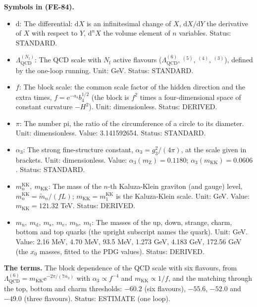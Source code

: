 \documentclass[
  10pt,
]{article}
\providecommand{\tightlist}{%
  \setlength{\itemsep}{0pt}\setlength{\parskip}{0pt}}
\begin{document}
\textbf{Symbols in (FE-84).}

\begin{itemize}
\tightlist
\item
  \(\mathrm{d}\): The differential: \(\mathrm{d}X\) is an infinitesimal
  change of \(X\), \(\mathrm{d}X/\mathrm{d}Y\) the derivative of \(X\)
  with respect to \(Y\), \(\mathrm{d}^nX\) the volume element of \(n\)
  variables. Status: STANDARD.
\item
  \(\Lambda_{\mathrm{QCD}}^{(N_{\mathrm{f}})}\): The QCD scale with
  \(N_{\mathrm{f}}\) active flavours (\(\Lambda_{\mathrm{QCD}}^{(6)}\),
  \(^{(5)}\), \(^{(4)}\), \(^{(3)}\)), defined by the one-loop running.
  Unit: GeV. Status: STANDARD.
\item
  \(f\): The block scale: the common scale factor of the hidden
  direction and the extra times, \(f = \mathrm{e}^{-a_4}b_4^{1/2}\) (the
  block is \(f^2\) times a four-dimensional space of constant curvature
  \(-H^2\)). Unit: dimensionless. Status: DERIVED.
\item
  \(\pi\): The number pi, the ratio of the circumference of a circle to
  its diameter. Unit: dimensionless. Value: 3.141592654. Status:
  STANDARD.
\item
  \(\alpha_3\): The strong fine-structure constant,
  \(\alpha_3 = g_3^2/(4\pi)\), at the scale given in brackets. Unit:
  dimensionless. Value: \(\alpha_3(m_{\mathrm{Z}}) = 0.1180\);
  \(\alpha_3(m_{\mathrm{KK}}) = 0.0606\). Status: STANDARD.
\item
  \(m^{\mathrm{KK}}_n,\ m_{\mathrm{KK}}\): The mass of the \(n\)-th
  Kaluza-Klein graviton (and gauge) level,
  \(m^{\mathrm{KK}}_n = \tilde m_n/(fL)\);
  \(m_{\mathrm{KK}} = m^{\mathrm{KK}}_1\) is the Kaluza-Klein scale.
  Unit: GeV. Value: \(m_{\mathrm{KK}} = 121.32\) TeV. Status: DERIVED.
\item
  \(m_{\mathrm{u}},\ m_{\mathrm{d}},\ m_{\mathrm{s}},\ m_{\mathrm{c}},\ m_{\mathrm{b}},\ m_{\mathrm{t}}\):
  The masses of the up, down, strange, charm, bottom and top quarks (the
  upright subscript names the quark). Unit: GeV. Value: 2.16 MeV, 4.70
  MeV, 93.5 MeV, 1.273 GeV, 4.183 GeV, 172.56 GeV (the \(x_0\) masses,
  fitted to the PDG values). Status: DERIVED.
\end{itemize}

\textbf{The terms.} The block dependence of the QCD scale with six
flavours, from
\(\Lambda^{(6)}_{\mathrm{QCD}} = m_{\mathrm{KK}}\mathrm{e}^{-2\pi/(7\alpha_3)}\)
with \(\alpha_3 \propto f^{-4}\) and \(m_{\mathrm{KK}} \propto 1/f\),
and the matching through the top, bottom and charm thresholds: \(-60.2\)
(six flavours), \(-55.6\), \(-52.0\) and \(-49.0\) (three flavours).
Status: ESTIMATE (one loop).
\end{document}
